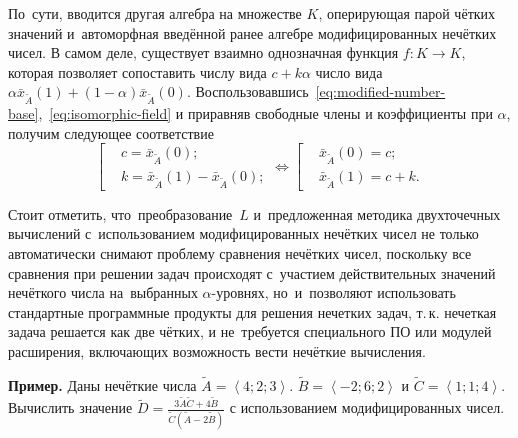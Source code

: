 По~сути, вводится другая алгебра на множестве $K$, оперирующая парой чётких значений и~автоморфная введённой ранее алгебре модифицированных нечётких чисел. В самом деле, существует взаимно однозначная функция $f:K\to K$, которая позволяет сопоставить числу вида $c+k\alpha $ число вида $\alpha \bar{x}_{\tilde A}\left( 1 \right)+\left( 1-\alpha  \right)\bar{x}_{\tilde A}\left( 0 \right)$. Воспользовавшись~\eqref{eq:modified-number-base},~\eqref{eq:isomorphic-field} и приравняв свободные члены и коэффициенты при $\alpha$, получим следующее соответствие
\begin{equation*}
  \left[ \begin{aligned}
    & c=\bar{x}_{\tilde A}\left( 0 \right); \\ 
    & k=\bar{x}_{\tilde A}\left( 1 \right)-\bar{x}_{\tilde A}\left( 0 \right);
  \end{aligned} \right.
  \Leftrightarrow 
  \left[ \begin{aligned}
    & \bar{x}_{\tilde A}\left( 0 \right)=c; \\ 
    & \bar{x}_{\tilde A}\left( 1 \right)=c+k.
  \end{aligned} \right.
\end{equation*}

Стоит отметить, что~преобразование~$L$ и~предложенная методика двухточечных вычислений с~использованием модифицированных нечётких чисел не только автоматически снимают проблему сравнения нечётких чисел, поскольку все сравнения при решении задач происходят с~участием действительных значений нечёткого числа на~выбранных $\alpha$-уровнях, но~и~позволяют использовать стандартные программные продукты для решения нечетких задач, т.\,к. нечеткая задача решается как две чётких, и не~требуется специального ПО или модулей расширения, включающих возможность вести нечёткие вычисления.

\textbf{Пример.} Даны нечёткие числа $\tilde{A}=\left\langle 4;2;3 \right\rangle $. $\tilde{B}=\left\langle -2;6;2 \right\rangle $ и $\tilde{C}=\left\langle 1;1;4 \right\rangle $. Вычислить значение $\displaystyle \tilde{D}=\frac{3\tilde{A}\tilde{C}+4\tilde{B}}{\tilde{C}\left( \tilde{A}-2\tilde{B} \right)}$ с использованием модифицированных чисел.

